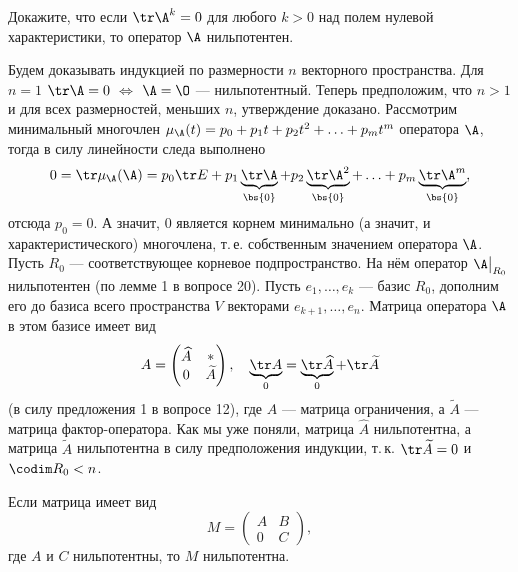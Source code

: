 \begin{problem}
    Докажите, что если $\tr\A^k = 0$ для любого $k > 0$ над полем нулевой характеристики, то оператор $\A$ нильпотентен.
\end{problem}

\begin{solution}
    Будем доказывать индукцией по размерности $n$ векторного пространства. Для $n = 1$ $\tr\A = 0$ $\Leftrightarrow$ $\A = \O$ --- нильпотентный. Теперь предположим, что $n > 1$ и для всех размерностей, меньших $n$, утверждение доказано. Рассмотрим минимальный многочлен $\mu_\A(t) = p_0 + p_1t + p_2t^2 + \ldots + p_mt^m$ оператора $\A$, тогда в силу линейности следа выполнено
    \[
        0 = \tr\mu_\A(\A) = p_0\tr E + p_1\underbrace{\tr\A}_{\bs{0}} + p_2\underbrace{\tr\A^2}_{\bs{0}} + \ldots + p_m\underbrace{\tr\A^m}_{\bs{0}},
    \]
    отсюда $p_0 = 0$. А значит, $0$ является корнем минимально (а значит, и характеристического) многочлена, т.\,е. собственным значением оператора $\A$. Пусть $R_0$ --- соответствующее корневое подпространство. На нём оператор $\A\big|_{R_0}$ нильпотентен (по лемме 1 в вопросе 20). Пусть $e_1, \ldots, e_k$ --- базис $R_0$, дополним его до базиса всего пространства $V$ векторами $e_{k + 1}, \ldots, e_n$. Матрица оператора $\A$ в этом базисе имеет вид
    \[
        A =
        \begin{pmatrix}
            \widehat{A} & \ast\\
            0 & \widetilde{A}
        \end{pmatrix},\quad\underbrace{\tr A}_0 = \underbrace{\tr\widehat{A}}_0 + \tr\widetilde{A}
    \]
    (в силу предложения 1 в вопросе 12), где $\widehat{A}$ --- матрица ограничения, а $\widetilde{A}$ --- матрица фактор-оператора. Как мы уже поняли, матрица $\widehat{A}$ нильпотентна, а матрица $\widetilde{A}$ нильпотентна в силу предположения индукции, т.\,к. $\tr\widetilde{A} = 0$ и $\codim R_0 < n$. 
    
    \begin{lemma}
        Если матрица имеет вид
        \[
            M =
            \begin{pmatrix}
                A & B\\
                0 & C
            \end{pmatrix},
        \]
        где $A$ и $C$ нильпотентны, то $M$ нильпотентна.
    \end{lemma}


\end{solution}
